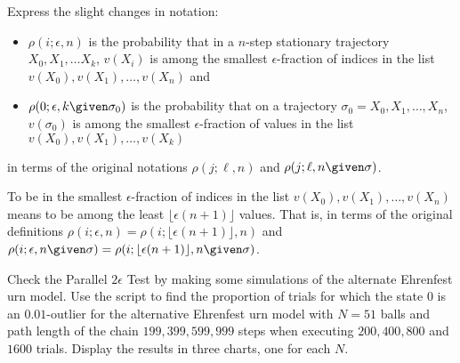 \documentclass[12pt]{article}
\begin{document}
\begin{exercise}
    Express the slight changes in notation:
    \begin{itemize}
        \item
            \( \rho(i; \epsilon, n) \) is the probability that in a \( n
            \)-step stationary trajectory \( X_0, X_1, \dots X_k \), \(
            v(X_i) \) is among the smallest \( \epsilon \)-fraction of
            indices in the list \( v(X_0), v(X_1), \dots, v(X_n) \) and
        \item
            \( \rho(0; \epsilon, k \given \sigma_0) \) is the
            probability that on a trajectory \( \sigma_0 = X_0, X_1,
            \dots, X_n \), \( v(\sigma_0) \) is among the smallest \(
            \epsilon \)-fraction of values in the list \( v(X_0), v(X_1),
            \dots, v(X_k) \)
    \end{itemize}
    in terms of the original notations \( \rho(j; \ell, n) \) and \(
    \rho(j; \ell, n \given \sigma) \).
\end{exercise}
\begin{solution}
    To be in the smallest \( \epsilon \)-fraction of indices in the list
    \( v(X_0), v(X_1), \dots, v(X_n) \) means to be among the least \(
    \lfloor \epsilon (n+1) \rfloor \) values.  That is, in terms of the
    original definitions \( \rho(i; \epsilon, n) = \rho(i; \lfloor
    \epsilon (n+1) \rfloor, n) \) and \( \rho(i; \epsilon, n \given
    \sigma) = \rho(i; \lfloor \epsilon (n+1) \rfloor, n \given \sigma) \).

\end{solution}
\begin{exercise}
    Check the Parallel \( 2 \epsilon \) Test by making some simulations
    of the alternate Ehrenfest urn model.  Use the script to find the
    proportion of trials for which the state \( 0 \) is an \( 0.01 \)-outlier
    for the alternative Ehrenfest urn model with \( N = 51 \) balls and
    path length of the chain \( 199, 399, 599, 999 \) steps when
    executing \( 200, 400, 800 \) and \( 1600 \) trials.  Display the
    results in three charts, one for each \( N \).
\end{exercise}
\end{document}
